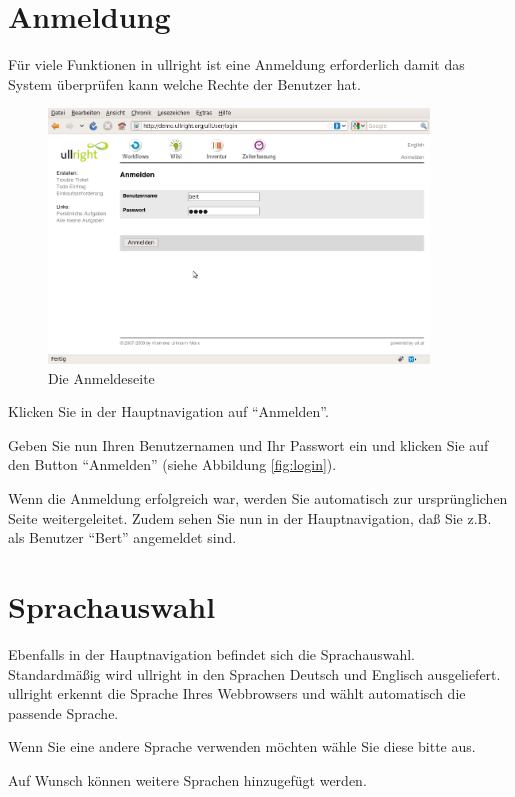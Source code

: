 \documentclass[article, a4paper, oneside, 11pt]{memoir}
\begin{document}
\section{Anmeldung}
Für viele Funktionen in ullright ist eine Anmeldung erforderlich damit das System überprüfen kann welche Rechte der Benutzer hat.

\begin{figure}[htp]
\centering
\includegraphics[trim=0 250pt 0 0,clip,width=0.9\textwidth]{figures/ullrightgermanexport-img4.png}
\caption{Die Anmeldeseite}
\label{fig:login}
\end{figure}

Klicken Sie in der Hauptnavigation auf "`Anmelden"'.

Geben Sie nun Ihren Benutzernamen und Ihr Passwort ein und klicken Sie auf den Button "`Anmelden"' (siehe Abbildung \vref{fig:login}).

Wenn die Anmeldung erfolgreich war, werden Sie automatisch zur ursprünglichen Seite weitergeleitet. Zudem sehen Sie nun in der Hauptnavigation, daß Sie z.B. als Benutzer "`Bert"' angemeldet sind.

\section{Sprachauswahl}
Ebenfalls in der Hauptnavigation befindet sich die Sprachauswahl. Standardmäßig wird ullright in den Sprachen Deutsch und Englisch ausgeliefert. ullright erkennt die Sprache Ihres Webbrowsers und wählt automatisch die passende Sprache. 

Wenn Sie eine andere Sprache verwenden möchten wähle Sie diese bitte aus.

Auf Wunsch können weitere Sprachen hinzugefügt werden.
\end{document}
